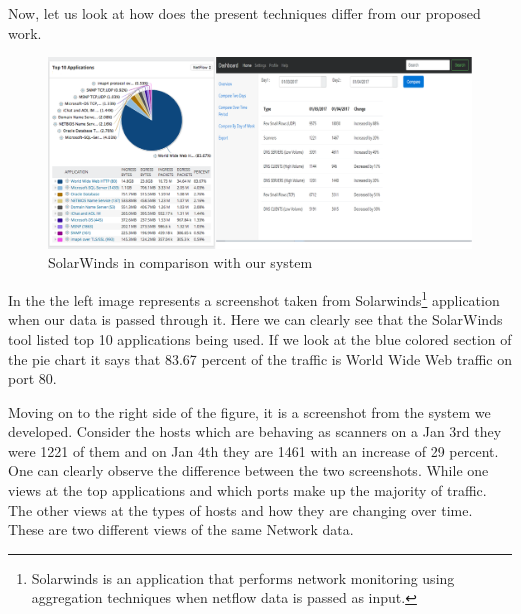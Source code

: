 Now, let us look at how does the present techniques differ from our proposed work.


\begin{figure}[ht]
	\centerline{\includegraphics[scale = 0.6]{intro.png}}
	\caption{SolarWinds in comparison with our system}%
\end{figure}

In the  the left image represents a screenshot taken from Solarwinds\footnote{Solarwinds is an application that performs network monitoring using aggregation techniques when netflow data is passed as input.} application when our data is passed through it. Here we can clearly see that the SolarWinds tool listed top 10 applications being used. If we look at the blue colored section of the pie chart it says that 83.67 percent of the traffic is World Wide Web traffic on port 80. 

Moving on to the right side of the figure, it is a screenshot from the system we developed. Consider the hosts which are behaving as scanners on a Jan 3rd they were 1221 of them and on Jan 4th they are 1461 with an increase of 29 percent. One can clearly observe the difference between the two screenshots. While one views at the top applications and which ports make up the majority of traffic. The other views at the types of hosts and how they are changing over time. These are two different views of the same Network data.

